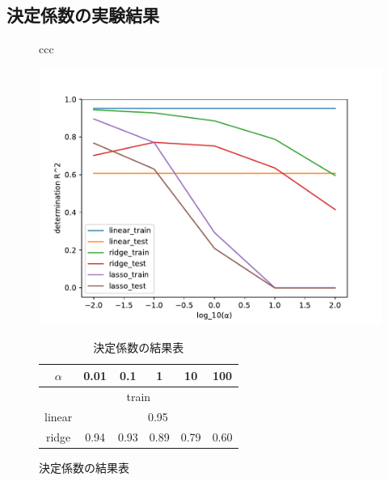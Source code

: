 \documentclass[dvipdfmx, 10pt]{beamer}
\begin{document}
\subsection{決定係数の実験結果}
    \begin{frame}{\insertsubsection}
       \begin{figure}[H]
        \begin{tabular}{ccc}
    	 \begin{minipage}{0.4\hsize}
                    	\includegraphics[width=1.0\linewidth]{../img/score.pdf}
                    	\caption{決定係数の推移}
                   	\label{fig:score}
              \end{minipage}
    	 \begin{minipage}{0.6\hsize}
                	 \begin{table}[H]
                        	\centering
                        	\caption{決定係数の結果表}
                                	\begin{tabular}{|c|c|c|c|c|c|}
                        		\hline
                                		$\alpha$ & 0.01 & 0.1 & 1 & 10 & 100\\ 
                        		\hline
                        		\hline
                        		\multicolumn{6}{|c|}{train} \\
                        		\hline
                        		linear & \multicolumn{5}{|c|}{0.95} \\
                        		\hline
                        		ridge & 0.94 & 0.93 & 0.89 & 0.79 & 0.60 \\
                        		\hline

\end{tabular}
\end{table}
\end{minipage}
\end{tabular}
\end{figure}
\end{frame}
\end{document}
